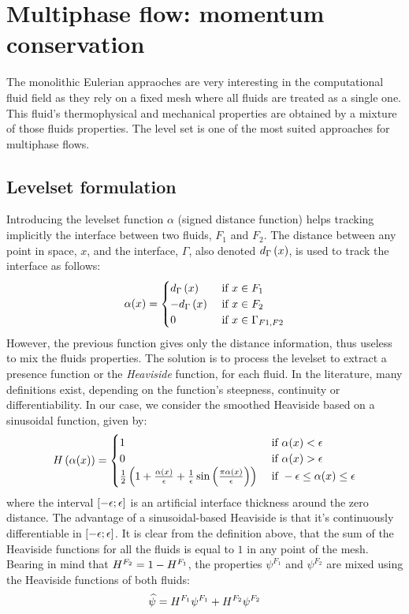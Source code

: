 \documentclass[11pt,a4paper]{article}
\begin{document}
\section{Multiphase flow: momentum conservation}
The monolithic Eulerian appraoches are very interesting in the computational fluid field as they rely on a fixed mesh
where all fluids are treated as a single one. This fluid's thermophysical and mechanical properties are obtained by a 
mixture of those fluids properties. The level set is one of the most suited approaches for multiphase flows.
\subsection{Levelset formulation}
Introducing the levelset function $\alpha$ (signed distance function) helps tracking implicitly the interface between two fluids, $F_1$ and $F_2$.
The distance between any point in space, $x$, and the interface, $\Gamma$, also denoted $d_{\Gamma} \left( x \right)$, is used to track the interface as follows:
\begin{align}
\alpha(x) = 
\begin{cases}
 d_{\Gamma} \left( x \right) 		& \text{ if } x \in F_1 \\ 
 -d_{\Gamma} \left( x \right)	 	& \text{ if } x \in F_2 \\ 
 0 							& \text{ if } x \in \Gamma_{F1, F2} 
\end{cases}
\end{align}
However, the previous function gives only the distance information, thus useless to mix the fluids properties.
The solution is to process the levelset to extract a presence function or the \emph{Heaviside} function, for each fluid.
In the literature, many definitions exist, depending on the function's steepness, continuity or differentiability. In our case, we consider the 
smoothed Heaviside based on a sinusoidal function, given by:
\begin{align}
H\left( \alpha(x) \right) = 
\begin{cases}
	1  & \text{ if } \alpha(x) < \epsilon \\
    0  & \text{ if } \alpha(x) > \epsilon \\  
    \frac{1}{2} \left( 1+ \frac{\alpha(x)}{\epsilon} + \frac{1}{\epsilon}\sin \left( \frac{\pi \alpha(x)}{\epsilon } \right)  \right) & \text{ if } - \epsilon \leq \alpha(x) \leq \epsilon
\end{cases}
\end{align}
where the interval $\left[ -\epsilon; \epsilon \right]$ is an artificial interface thickness around the zero distance. 
The advantage of a sinusoidal-based Heaviside is that it's continuously differentiable in $\left[ -\epsilon; \epsilon \right]$.
It is clear from the definition above, that the sum of the Heaviside functions for all the fluids is equal to $1$
in any point of the mesh. Bearing in mind that $H^{F_2} = 1-H^{F_1}$, the properties $\psi^{F_1}$ and $\psi^{F_2}$ 
are mixed using the Heaviside functions of both fluids:
\begin{align}
\label{eq:mixing}
\widehat{\psi} = H^{F_1} \psi^{F_1} + H^{F_2} \psi^{F_2}
\end{align}
\end{document}
